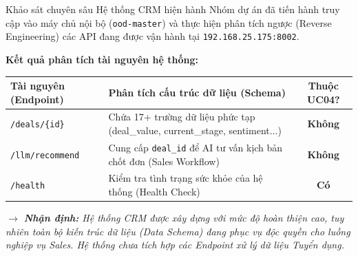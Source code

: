 \begin{frame}{Khảo sát chuyên sâu Hệ thống CRM hiện hành}
    Nhóm dự án đã tiến hành truy cập vào máy chủ nội bộ (\texttt{ood-master}) và thực hiện phân tích ngược (Reverse Engineering) các API đang được vận hành tại \texttt{192.168.25.175:8002}.
    \vspace{0.2cm}
    
    \textbf{Kết quả phân tích tài nguyên hệ thống:}
    \begin{table}[]
        \centering
        \begin{tabular}{|l|p{5cm}|c|}
            \hline
            \textbf{Tài nguyên (Endpoint)} & \textbf{Phân tích cấu trúc dữ liệu (Schema)} & \textbf{Thuộc UC04?} \\ \hline
            \texttt{/deals/\{id\}} & Chứa 17+ trường dữ liệu phức tạp (deal\_value, current\_stage, sentiment...) & \textbf{Không} \\ \hline
            \texttt{/llm/recommend} & Cung cấp \texttt{deal\_id} để AI tư vấn kịch bản chốt đơn (Sales Workflow) & \textbf{Không} \\ \hline
            \texttt{/health} & Kiểm tra tình trạng sức khỏe của hệ thống (Health Check) & \textbf{Có} \\ \hline
        \end{tabular}
    \end{table}
    
    \vspace{0.2cm}
    \textit{$\rightarrow$ \textbf{Nhận định:} Hệ thống CRM được xây dựng với mức độ hoàn thiện cao, tuy nhiên toàn bộ kiến trúc dữ liệu (Data Schema) đang phục vụ độc quyền cho luồng nghiệp vụ Sales. Hệ thống chưa tích hợp các Endpoint xử lý dữ liệu Tuyển dụng.}
\end{frame}

